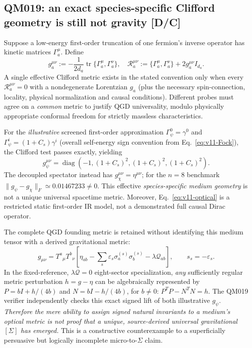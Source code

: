 \documentclass[11pt,a4paper]{article}
\begin{document}
\subsection{QM019: an exact species-specific Clifford geometry is still not gravity [D/C]}\label{sec:v11-tomography}
Suppose a low-energy first-order truncation of one fermion's inverse operator has kinetic matrices $\Gamma_a^\mu$. Define
\begin{equation}\label{eq:v11-cliff-test}
 g_a^{\mu\nu}:=-\frac1{2d_a}\operatorname{tr}\{\Gamma_a^\mu,\Gamma_a^\nu\},\quad
 \mathcal R_a^{\mu\nu}:=\{\Gamma_a^\mu,\Gamma_a^\nu\}+2g_a^{\mu\nu}I_{d_a}.
\end{equation}
A single effective Clifford metric exists in the stated convention only when every $\mathcal R_a^{\mu\nu}=0$ with a nondegenerate Lorentzian $g_a$ (plus the necessary spin-connection, locality, physical normalization and causal conditions). Different probes must agree on a \emph{common} metric to justify QGD universality, modulo physically appropriate conformal freedom for strictly massless characteristics.

For the \emph{illustrative} screened first-order approximation $\Gamma_\psi^0=\gamma^0$ and $\Gamma_\psi^i=(1+C_s)\gamma^i$ (overall self-energy sign convention from Eq.~\eqref{eq:v11-Fock}), the Clifford test passes exactly, yielding
\begin{equation}\label{eq:v11-optical}
\boxed{g_\psi^{\mu\nu}=\operatorname{diag}(-1,(1+C_s)^2,(1+C_s)^2,(1+C_s)^2).}
\end{equation}
The decoupled spectator instead has $g_\chi^{\mu\nu}=\eta^{\mu\nu}$; for the $n=8$ benchmark $\|g_\psi-g_\chi\|_F\simeq0.01467233\ne0$. This effective \emph{species-specific medium geometry} is not a unique universal spacetime metric. Moreover, Eq.~\eqref{eq:v11-optical} is a restricted static first-order IR model, not a demonstrated full causal Dirac operator.

The complete QGD founding metric is retained without identifying this medium tensor with a derived gravitational metric:
\begin{equation}\label{eq:v11-master}
\boxed{g_{\mu\nu}=T^a{}_\mu T^b{}_\nu\left[\eta_{ab}
 -\sum_s\varepsilon_s\sigma_a^{(s)}\sigma_b^{(s)}-\lambda\mathcal Q_{ab}\right],\qquad s_s=-\varepsilon_s.}
\end{equation}
In the fixed-reference, $\lambda\mathcal Q=0$ eight-sector specialization, \emph{any} sufficiently regular metric perturbation $h=g-\eta$ can be algebraically represented by $P=bI+h/(4b)$ and $N=bI-h/(4b)$, for $b\ne0$: $P^TP-N^TN=h$. The QM019 verifier independently checks this exact signed lift of both illustrative $g_\psi$. \emph{Therefore the mere ability to assign signed natural invariants to a medium's optical metric is not proof that a unique, source-derived universal gravitational $[\Sigma]$ has emerged.} This is a constructive counterexample to a superficially persuasive but logically incomplete micro-to-$\Sigma$ claim.
\end{document}
